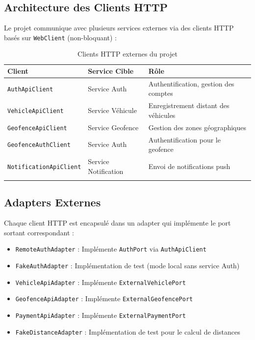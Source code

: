\documentclass[12pt,a4paper]{report}
\begin{document}
\subsection{Architecture des Clients HTTP}

Le projet communique avec plusieurs services externes via des clients HTTP basés sur \texttt{WebClient} (non-bloquant) :

\begin{longtable}{p{4.5cm}p{3.5cm}p{5cm}}
\toprule
\textbf{Client} & \textbf{Service Cible} & \textbf{Rôle} \\
\midrule
\endhead
\texttt{AuthApiClient} & Service Auth & Authentification, gestion des comptes \\
\texttt{VehicleApiClient} & Service Véhicule & Enregistrement distant des véhicules \\
\texttt{GeofenceApiClient} & Service Geofence & Gestion des zones géographiques \\
\texttt{GeofenceAuthClient} & Service Auth & Authentification pour le geofence \\
\texttt{NotificationApiClient} & Service Notification & Envoi de notifications push \\
\bottomrule
\caption{Clients HTTP externes du projet}
\end{longtable}

\subsection{Adapters Externes}

Chaque client HTTP est encapsulé dans un adapter qui implémente le port sortant correspondant :

\begin{itemize}[leftmargin=2cm]
  \item \texttt{RemoteAuthAdapter} : Implémente \texttt{AuthPort} via \texttt{AuthApiClient}
  \item \texttt{FakeAuthAdapter} : Implémentation de test (mode local sans service Auth)
  \item \texttt{VehicleApiAdapter} : Implémente \texttt{ExternalVehiclePort}
  \item \texttt{GeofenceApiAdapter} : Implémente \texttt{ExternalGeofencePort}
  \item \texttt{PaymentApiAdapter} : Implémente \texttt{ExternalPaymentPort}
  \item \texttt{FakeDistanceAdapter} : Implémentation de test pour le calcul de distances
\end{itemize}
\end{document}
